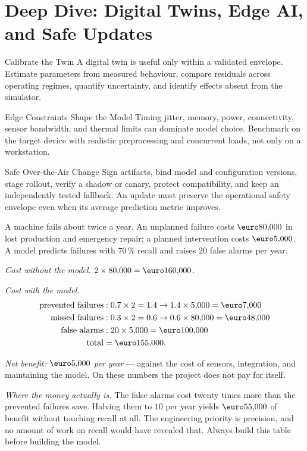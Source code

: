 %
\section{Deep Dive: Digital Twins, Edge AI, and Safe Updates}
\begin{v3topic}{Calibrate the Twin}
A digital twin is useful only within a validated envelope.
Estimate parameters from measured behaviour, compare residuals across operating
regimes, quantify uncertainty, and identify effects absent from the simulator.

\end{v3topic}
\begin{v3topic}{Edge Constraints Shape the Model}
Timing jitter, memory, power, connectivity, sensor bandwidth, and thermal limits
can dominate model choice.
Benchmark on the target device with realistic preprocessing and concurrent
loads, not only on a workstation.

\end{v3topic}
\begin{v3topic}{Safe Over-the-Air Change}
Sign artifacts, bind model and configuration versions, stage rollout, verify a
shadow or canary, protect compatibility, and keep an independently tested
fallback.
An update must preserve the operational safety envelope even when its average
prediction metric improves.
\end{v3topic}


\begin{workedexample}
A machine fails about twice a year. An unplanned failure costs
$\text{\euro}80{,}000$ in lost production and emergency repair; a planned
intervention costs $\text{\euro}5{,}000$. A model predicts failures with
$70\,\%$ recall and raises $20$ false alarms per year.

\emph{Cost without the model.} $2 \times 80{,}000 = \text{\euro}160{,}000$.

\emph{Cost with the model.}
\[
\begin{aligned}
  \text{prevented failures} &: 0.7\times2 = 1.4
    \rightarrow 1.4\times5{,}000 = \text{\euro}7{,}000\\
  \text{missed failures} &: 0.3\times2 = 0.6
    \rightarrow 0.6\times80{,}000 = \text{\euro}48{,}000\\
  \text{false alarms} &: 20\times5{,}000 = \text{\euro}100{,}000\\
  \text{total} &= \text{\euro}155{,}000 .
\end{aligned}
\]

\emph{Net benefit: $\text{\euro}5{,}000$ per year} --- against the cost of
sensors, integration, and maintaining the model. On these numbers the project
does not pay for itself.

\emph{Where the money actually is.} The false alarms cost twenty times more
than the prevented failures save. Halving them to $10$ per year yields
$\text{\euro}55{,}000$ of benefit without touching recall at all. The
engineering priority is precision, and no amount of work on recall would have
revealed that. Always build this table before building the model.
\end{workedexample}

